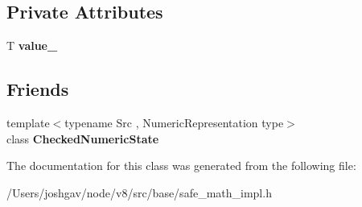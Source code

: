 \subsection*{Private Attributes}
\begin{DoxyCompactItemize}
\item 
T {\bfseries value\+\_\+}\hypertarget{classv8_1_1base_1_1internal_1_1_checked_numeric_state_3_01_t_00_01_n_u_m_e_r_i_c___f_l_o_a_t_i_n_g_01_4_aa5bdcc2cfd11d4c3f75f916fc1059137}{}\label{classv8_1_1base_1_1internal_1_1_checked_numeric_state_3_01_t_00_01_n_u_m_e_r_i_c___f_l_o_a_t_i_n_g_01_4_aa5bdcc2cfd11d4c3f75f916fc1059137}

\end{DoxyCompactItemize}
\subsection*{Friends}
\begin{DoxyCompactItemize}
\item 
{\footnotesize template$<$typename Src , Numeric\+Representation type$>$ }\\class {\bfseries Checked\+Numeric\+State}\hypertarget{classv8_1_1base_1_1internal_1_1_checked_numeric_state_3_01_t_00_01_n_u_m_e_r_i_c___f_l_o_a_t_i_n_g_01_4_aa1362ebca148abcec1d121fc04fb976b}{}\label{classv8_1_1base_1_1internal_1_1_checked_numeric_state_3_01_t_00_01_n_u_m_e_r_i_c___f_l_o_a_t_i_n_g_01_4_aa1362ebca148abcec1d121fc04fb976b}

\end{DoxyCompactItemize}


The documentation for this class was generated from the following file\+:\begin{DoxyCompactItemize}
\item 
/\+Users/joshgav/node/v8/src/base/safe\+\_\+math\+\_\+impl.\+h\end{DoxyCompactItemize}
